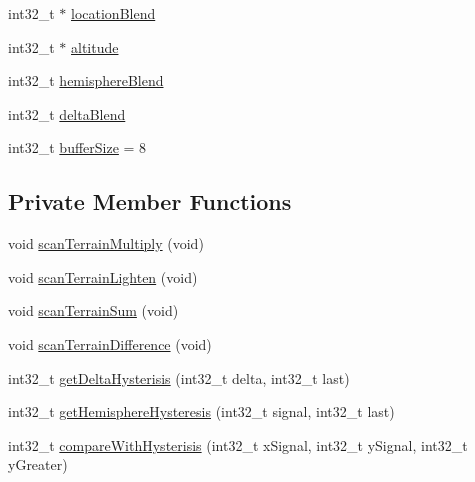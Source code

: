 \begin{DoxyCompactItemize}
int32\+\_\+t $\ast$ \mbox{\hyperlink{class_three_axis_scanner_a42ad93158a65ff98a1eebc9bfd772b65}{location\+Blend}}
\item 
int32\+\_\+t $\ast$ \mbox{\hyperlink{class_three_axis_scanner_aa6c1a21084147bf05b0f1f29de17c9e4}{altitude}}
\item 
int32\+\_\+t \mbox{\hyperlink{class_three_axis_scanner_aa01ba56910f131050ff8ac4b78e55210}{hemisphere\+Blend}}
\item 
int32\+\_\+t \mbox{\hyperlink{class_three_axis_scanner_abcccc514a2b9d926b101a82021fca3b2}{delta\+Blend}}
\item 
int32\+\_\+t \mbox{\hyperlink{class_three_axis_scanner_a6a080649633743470149b7ad3f8f85fb}{buffer\+Size}} = 8
\end{DoxyCompactItemize}
\subsection*{Private Member Functions}
\begin{DoxyCompactItemize}
\item 
void \mbox{\hyperlink{class_three_axis_scanner_a3706b4fadf1553064b52ca3602579c64}{scan\+Terrain\+Multiply}} (void)
\item 
void \mbox{\hyperlink{class_three_axis_scanner_a114aa4a7e22ccb30d1d1cf9a793a33a5}{scan\+Terrain\+Lighten}} (void)
\item 
void \mbox{\hyperlink{class_three_axis_scanner_adaa600e4f33d6cfda8841e6235e6fe92}{scan\+Terrain\+Sum}} (void)
\item 
void \mbox{\hyperlink{class_three_axis_scanner_a6f4c60269adf60a72aae8b13d5585a88}{scan\+Terrain\+Difference}} (void)
\item 
int32\+\_\+t \mbox{\hyperlink{class_three_axis_scanner_a09735acf1f7906a7f4aad3165f3c454c}{get\+Delta\+Hysterisis}} (int32\+\_\+t delta, int32\+\_\+t last)
\item 
int32\+\_\+t \mbox{\hyperlink{class_three_axis_scanner_a198db246717d1c653568bb44310b48a7}{get\+Hemisphere\+Hysteresis}} (int32\+\_\+t signal, int32\+\_\+t last)
\item 
int32\+\_\+t \mbox{\hyperlink{class_three_axis_scanner_aa2bcef759f2a4bac59f38bf23e3cb318}{compare\+With\+Hysterisis}} (int32\+\_\+t x\+Signal, int32\+\_\+t y\+Signal, int32\+\_\+t y\+Greater)
\end{DoxyCompactItemize}

